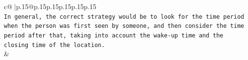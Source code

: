 \documentclass{article}
\begin{document}
{\begin{supertabular}{c@{$\;$}|p{.15\linewidth}@{}p{.15\linewidth}p{.15\linewidth}p{.15\linewidth}p{.15\linewidth}p{.15\linewidth}}
{{{\\ 
\texttt{In general, the correct strategy would be to look for the time period when the person was first seen by someone, and then consider the time period after that, taking into account the wake{-}up time and the closing time of the location.} \\
            }
        }
    }
    & \\ \\

\end{supertabular}
}
\end{document}
